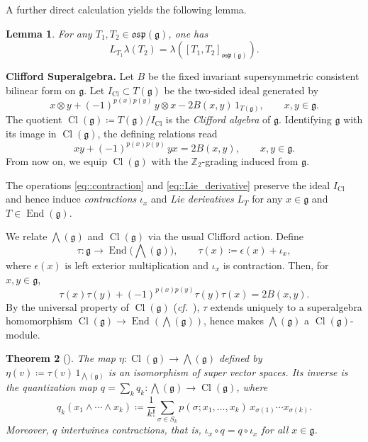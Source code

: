 \documentclass[11pt]{amsart}
\newcommand{\End}{\operatorname{End}}
\def\Cl{{\operatorname{Cl}}}
\def\osp{{\mathfrak{osp}}}
\def\gg{{\mathfrak{g}}}
\def\ZZ{{\mathbb Z}}
\theoremstyle{plain}
\newtheorem{theorem}{Theorem}
\newtheorem{lemma}[theorem]{Lemma}
\theoremstyle{remark}
\theoremstyle{definition}
\numberwithin{equation}{section}
\theoremstyle{remark}
\begin{document}
A further direct calculation yields the following lemma.

\begin{lemma} \label{lemm::Lie_derivative_and_lambd}
 For any $T_{1},T_{2} \in \osp(\gg)$, one has 
 \[
 L_{T_{1}} \lambda(T_{2})=\lambda([T_{1},T_{2}]_{\osp(\gg)}).
 \]
\end{lemma}

\noindent
\textbf{Clifford Superalgebra.} Let $B$ be the fixed invariant supersymmetric consistent bilinear form on $\gg$. Let $I_{\Cl}\subset T(\gg)$ be the two-sided ideal generated by
\begin{equation}
x\otimes y+(-1)^{p(x)p(y)}\,y\otimes x-2B(x,y)\,1_{T(\gg)},\qquad x,y\in\gg.
\end{equation}
The quotient
$
\Cl(\gg)\coloneqq T(\gg)/I_{\Cl}
$
is the \emph{Clifford algebra} of $\gg$. Identifying $\gg$ with its image in $\Cl(\gg)$, the defining relations read
\begin{equation}\label{eq::Clifford_relation}
xy+(-1)^{p(x)p(y)}\,yx=2B(x,y), \qquad x,y\in\gg.
\end{equation} 
From now on, we equip $\Cl(\gg)$ with the $\ZZ_{2}$-grading induced from $\gg$.

The operations \eqref{eq::contraction} and \eqref{eq::Lie_derivative} preserve the ideal $I_{\Cl}$ and hence induce \emph{contractions} $\iota_{x}$ and \emph{Lie derivatives} $L_{T}$ for any $x \in \gg$ and $T \in \End(\gg)$. 

We relate $\bigwedge(\gg)$ and $\Cl(\gg)$ via the usual Clifford action. Define
\begin{equation}
 \tau:\gg\to \End\bigl(\bigwedge(\gg)\bigr),\qquad \tau(x)\coloneqq \epsilon(x)+\iota_x,
\end{equation}
where $\epsilon(x)$ is left exterior multiplication and $\iota_x$ is contraction. Then, for $x,y\in\gg$,
\begin{equation}
 \tau(x)\tau(y)+(-1)^{p(x)p(y)}\tau(y)\tau(x)=2B(x,y).
\end{equation}
By the universal property of $\Cl(\gg)$ (\emph{cf.}~\cite[Proposition~3.1]{generalized_Clifford}), $\tau$ extends uniquely to a
superalgebra homomorphism $\Cl(\gg)\to \End(\bigwedge(\gg))$, hence makes $\bigwedge(\gg)$ a $\Cl(\gg)$-module.

\begin{theorem}[{\cite{generalized_Clifford}}]\label{thm::quantization_map}
The map $\eta:\Cl(\gg)\to \bigwedge(\gg)$ defined by
$ \eta(v)\coloneqq \tau(v)\,1_{\bigwedge(\gg)}
$
is an isomorphism of super vector spaces. Its inverse is the quantization map $q=\sum_k q_k:\bigwedge(\gg)\to \Cl(\gg)$, where
\begin{equation*}
q_k(x_1\wedge\cdots\wedge x_k)\coloneqq \frac1{k!}\sum_{\sigma\in S_k} p(\sigma;x_1,\ldots,x_k)\,
 x_{\sigma(1)}\cdots x_{\sigma(k)}.
\end{equation*}
Moreover, $q$ intertwines contractions, that is, $\iota_x\circ q=q\circ \iota_x$ for all $x \in \gg$.
\end{theorem}
\end{document}
